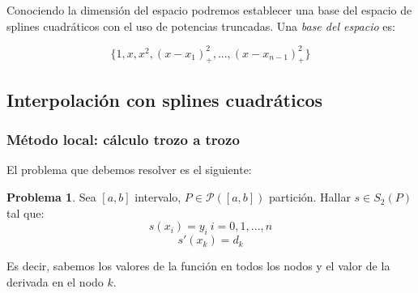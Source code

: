 \documentclass[11pt,spanish,]{article}
\theoremstyle{definition} \newtheorem*{definicion}{Definición}
\newtheorem*{problema}{Problema} \theoremstyle{remark}
\begin{document}
Conociendo la dimensión del espacio podremos establecer una base del
espacio de splines cuadráticos con el uso de potencias truncadas. Una
\emph{base del espacio} es:

\[\{1, x, x^2, (x-x_1)_+^2, ... , (x-x_{n-1})_+^2\}\]

\vspace*{2\baselineskip}

\subsection{Interpolación con splines
cuadráticos}\label{interpolaciuxf3n-con-splines-cuadruxe1ticos}

\subsubsection{Método local: cálculo trozo a
trozo}\label{muxe9todo-local-cuxe1lculo-trozo-a-trozo}

El problema que debemos resolver es el siguiente:

\begin{problema}
Sea $[a,b]$ intervalo, $P \in \mathscr{P}([a,b])$ partición. Hallar $s \in S_2(P)$ tal que:
$$s(x_i)=y_i\ i=0,1,...,n$$
$$s'(x_k)=d_k$$
\end{problema}

Es decir, sabemos los valores de la función en todos los nodos y el
valor de la derivada en el nodo $k$.

\vspace*{2\baselineskip}
\end{document}
